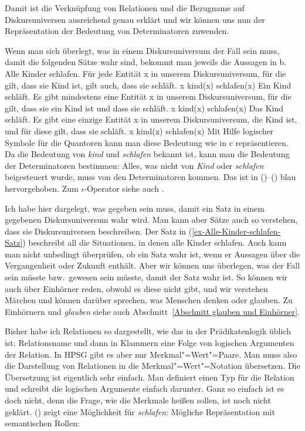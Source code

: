 Damit ist die Verknüpfung von Relationen und die Bezugname auf Diskursuniversen ausreichend genau
erklärt und wir können uns nun der Repräsentation der Bedeutung von Determinatoren zuwenden.

Wenn man sich überlegt, was in einem Diskursuniversum der Fall sein muss, damit die folgenden Sätze
wahr sind, bekommt man jeweils die Aussagen in b.
\eal
\label{ex-Alle-Kinder-schlafen}
\ex\label{ex-Alle-Kinder-schlafen-Satz} Alle Kinder schlafen.
\ex Für jede Entität x in unserem Diskursuniversum, für die gilt, dass sie Kind ist, gilt auch, dass sie schläft.
\ex \blau{$\forall$}x kind(x) \blau{$\to$} schlafen(x)
\zl
\eal
\ex Ein Kind schläft.
\ex Es gibt mindestens eine Entität x in unserem Diskursuniversum, für die gilt, dass sie ein Kind ist und dass sie schläft.
\ex \blau{$\exists$}x kind(x) \blau{$\wedge$} schlafen(x)
\zl
\eal
\label{ex-Das-Kind-schläft}
\ex Das Kind schläft.
\ex Es gibt eine einzige Entität x in unserem Diskursuniversum, die Kind ist, und für diese gilt, dass sie schläft.
\ex \blau{$\iota$}x kind(x) \blau{$\wedge$} schlafen(x)
\zl
Mit Hilfe logischer Symbole für die Quantoren kann man diese Bedeutung wie in c repräsentieren. Da
die Bedeutung von \emph{kind} und \emph{schlafen} bekannt ist, kann man die Bedeutung der
Determinatoren bestimmen: Alles, was nicht von \emph{Kind} oder \emph{schlafen} beigesteuert wurde,
muss von den Determinatoren kommen. Das ist in ()--() blau hervorgehoben. Zum
$\iota$-Operator siehe auch . 

Ich habe hier dargelegt, was gegeben sein muss, damit ein Satz in einem gegebenen Diskursuniversum
wahr wird. Man kann aber Sätze auch so verstehen, dass sie Diskursuniversen beschreiben. Der Satz in
(\ref{ex-Alle-Kinder-schlafen-Satz}) beschreibt all die Situationen, in denen alle Kinder
schlafen. Auch kann man nicht unbedingt überprüfen, ob ein Satz wahr ist, \zb wenn er Aussagen über
die Vergangenheit oder Zukunft enthält. Aber wir können uns überlegen, was der Fall sein müsste
bzw.\ gewesen sein müsste, damit der Satz wahr ist. So können wir auch über Einhörner reden, obwohl
es diese nicht gibt, und wir verstehen Märchen und können darüber sprechen, was Menschen denken oder
glauben. Zu Einhörnern und \emph{glauben} siehe auch Abschnitt~\ref{Abschnitt glauben und Einhörner}.

Bisher habe ich Relationen so dargestellt, wie das in der Prädikatenlogik üblich ist: Relationsname
und dann in Klammern eine Folge von logischen Argumenten der Relation. In HPSG gibt es aber nur
Merkmal"=Wert"=Paare. Man muss also die Darstellung von Relationen in die Merkmal"=Wert"=Notation
übersetzen. Die Übersetzung ist eigentlich sehr einfach. Man definiert einen Typ für die Relation
und schreibt die logischen Argumente einfach darunter. Ganz so einfach ist es doch nicht, denn die
Frage, wie die Merkmale heißen sollen, ist noch nicht geklärt. () zeigt eine Möglichkeit für \emph{schlafen}:
\ea
Mögliche Repräsentation mit semantischen Rollen:\\[2pt]
\z

